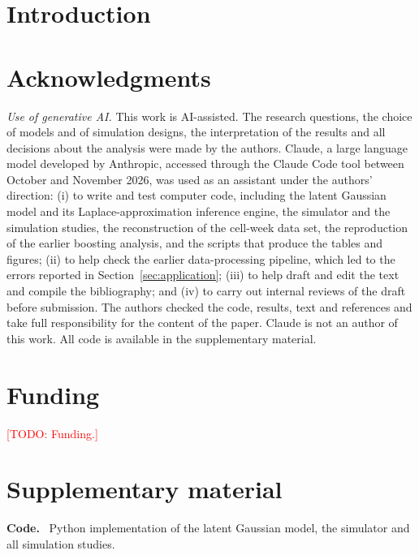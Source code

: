 \documentclass[aoas,preprint]{imsart}\def\IMSfallback{0}%
\newenvironment{funding}{\section*{Funding}}{}
\newenvironment{acks}[1][Acknowledgments]{\section*{#1}}{}
\newenvironment{supplement}{\section*{Supplementary material}}{}
\newcommand{\stitle}[1]{\textbf{#1.}\ }
\newcommand{\sdescription}[1]{#1}
\numberwithin{equation}{section}
\theoremstyle{plain}
\theoremstyle{definition}
\newcommand{\todo}[1]{\textcolor{red}{[TODO: #1]}}
\begin{document}
\section{Introduction}\label{sec:intro}










\begin{acks}[Acknowledgments]
\textit{Use of generative AI.} This work is AI-assisted. The research questions, the
choice of models and of simulation designs, the interpretation of the results and all
decisions about the analysis were made by the authors. Claude, a large language model
developed by Anthropic, accessed through the Claude Code tool between October and
November 2026, was used as an assistant under the authors' direction: (i) to write and
test computer code, including the latent Gaussian model and its Laplace-approximation
inference engine, the simulator and the simulation studies, the reconstruction of the
cell-week data set, the reproduction of the earlier boosting analysis, and the scripts
that produce the tables and figures; (ii) to help check the earlier data-processing
pipeline, which led to the errors reported in Section~\ref{sec:application}; (iii) to
help draft and edit the text and compile the bibliography; and (iv) to carry out
internal reviews of the draft before submission. The authors checked the code, results,
text and references and take full responsibility for the content of the paper. Claude is
not an author of this work. All code is available in the supplementary material.
\end{acks}

\begin{funding}
\todo{Funding.}
\end{funding}

\begin{supplement}
\stitle{Code}
\sdescription{Python implementation of the latent Gaussian model, the simulator
and all simulation studies.}
\end{supplement}


\end{document}

